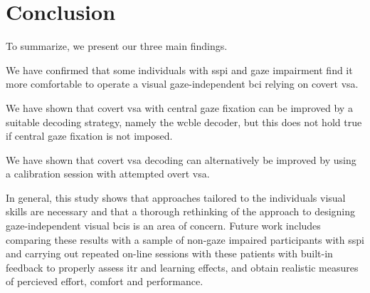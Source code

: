 \section{Conclusion}

To summarize, we present our three main findings.
\begin{enumerate*}
  \item We have confirmed that some individuals with \ac{sspi} and gaze
    impairment find it more comfortable to operate a visual gaze-independent
    \ac{bci} relying on covert \acf{vsa}.
  \item We have shown that covert \acf{vsa} with central gaze fixation can be
    improved by a suitable decoding strategy, namely the \acf{wcble} decoder,
    but this does not hold true if central gaze fixation is not imposed.
  \item We have shown that covert \ac{vsa}  decoding can alternatively be improved by
    using a calibration session with attempted overt \ac{vsa}.
\end{enumerate*}

In general, this study shows that approaches tailored to the individuals visual
skills are necessary and that a thorough rethinking of the approach to
designing gaze-independent visual \acp{bci} is an area of concern.
Future work includes comparing these results with a sample of non-gaze impaired
participants with \ac{sspi}
and carrying out repeated on-line sessions with these patients with built-in feedback to
properly assess \ac{itr} and learning effects, and obtain realistic measures of percieved effort,
comfort and performance.



